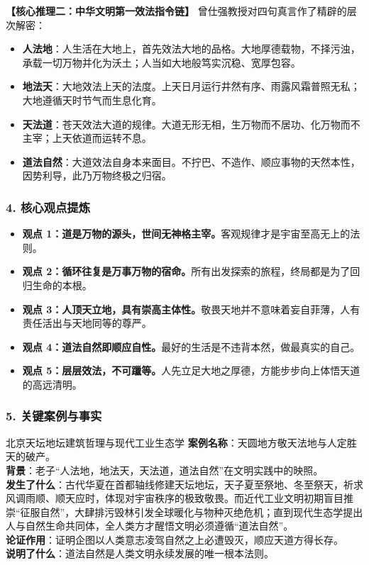 \noindent\textbf{【核心推理二：中华文明第一效法指令链】}
曾仕强教授对四句真言作了精辟的层次解密：
\begin{itemize}
    \item \textbf{人法地}：人生活在大地上，首先效法大地的品格。大地厚德载物，不择污浊，承载一切万物并化为沃土；人当如大地般笃实沉稳、宽厚包容。
    \item \textbf{地法天}：大地效法上天的法度。上天日月运行井然有序、雨露风霜普照无私；大地遵循天时节气而生息化育。
    \item \textbf{天法道}：苍天效法大道的规律。大道无形无相，生万物而不居功、化万物而不主宰；上天依道而运转不息。
    \item \textbf{道法自然}：大道效法自身本来面目。不拧巴、不造作、顺应事物的天然本性，因势利导，此乃万物终极之归宿。
\end{itemize}

\subsubsection{4. 核心观点提炼}
\begin{itemize}
    \item \textbf{观点 1：道是万物的源头，世间无神格主宰。}客观规律才是宇宙至高无上的法则。
    \item \textbf{观点 2：循环往复是万事万物的宿命。}所有出发探索的旅程，终局都是为了回归生命的本根。
    \item \textbf{观点 3：人顶天立地，具有崇高主体性。}敬畏天地并不意味着妄自菲薄，人有责任活出与天地同等的尊严。
    \item \textbf{观点 4：道法自然即顺应自性。}最好的生活是不违背本然，做最真实的自己。
    \item \textbf{观点 5：层层效法，不可躐等。}人先立足大地之厚德，方能步步向上体悟天道的高远清明。
\end{itemize}

\subsubsection{5. 关键案例与事实}
\begin{CaseBox}{北京天坛地坛建筑哲理与现代工业生态学}
\textbf{案例名称}：天圆地方敬天法地与人定胜天的破产。\\
\textbf{背景}：老子“人法地，地法天，天法道，道法自然”在文明实践中的映照。\\
\textbf{发生了什么}：古代华夏在首都轴线修建天坛地坛，天子夏至祭地、冬至祭天，祈求风调雨顺、顺天应时，体现对宇宙秩序的极致敬畏。而近代工业文明初期盲目推崇“征服自然”，大肆排污毁林引发全球暖化与物种灭绝危机；直到现代生态学提出人与自然生命共同体，全人类方才醒悟文明必须遵循“道法自然”。\\
\textbf{论证作用}：证明企图以人类意志凌驾自然之上必遭毁灭，顺应天道方得长存。\\
\textbf{说明了什么}：道法自然是人类文明永续发展的唯一根本法则。
\end{CaseBox}

